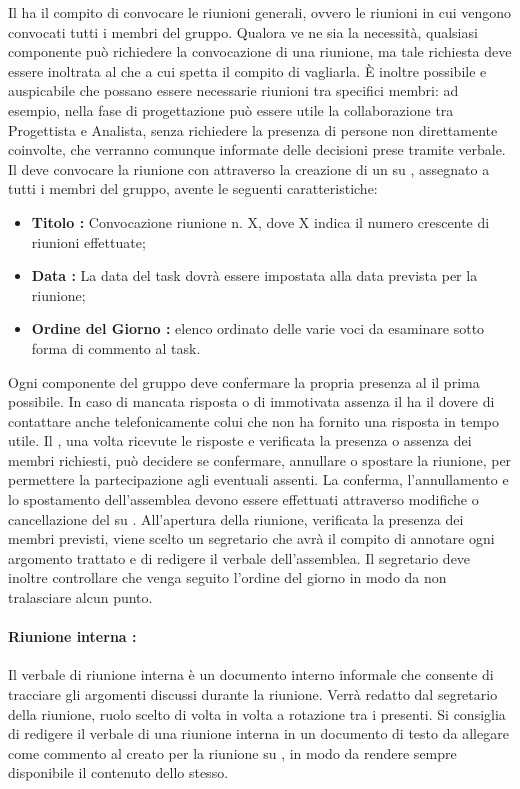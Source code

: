 \documentclass[12pt,a4paper]{article}
\begin{document}
Il \PM{} ha il compito di convocare le riunioni generali, ovvero le riunioni in cui vengono convocati tutti i membri del gruppo.
Qualora ve ne sia la necessità, qualsiasi componente può richiedere la convocazione di una riunione, ma tale richiesta deve essere inoltrata al \PM{} che a cui spetta il compito di vagliarla. È inoltre possibile e auspicabile che possano essere necessarie riunioni tra specifici membri: ad esempio, nella fase di progettazione può essere utile la collaborazione tra Progettista e Analista, senza richiedere la presenza di persone non direttamente coinvolte, che verranno comunque informate delle decisioni prese tramite verbale.
Il \PM{} deve convocare la riunione con attraverso la creazione di un \textit{} su \textit{}, assegnato a tutti i membri del gruppo, avente le seguenti caratteristiche:
\begin{itemize}
  \item \textbf{Titolo : } Convocazione riunione n. X, dove X indica il numero crescente di riunioni effettuate;
  \item \textbf{Data : } La data del task dovrà essere impostata alla data prevista per la riunione;
  \item \textbf{Ordine del Giorno : } elenco ordinato delle varie voci da esaminare sotto forma di commento al task.
\end{itemize}
Ogni componente del gruppo deve confermare la propria presenza al \PM{} il prima possibile. 
In caso di mancata risposta o di immotivata assenza il \PM{} ha il dovere di contattare anche telefonicamente colui che non ha fornito una risposta in tempo utile. Il \PM{}, una volta ricevute le risposte e verificata la presenza o assenza dei membri richiesti, può decidere se confermare, annullare o spostare la riunione, per permettere la partecipazione agli eventuali assenti. La conferma, l’annullamento e lo spostamento dell’assemblea devono essere effettuati attraverso modifiche o cancellazione del \textit{} su \textit{}.
All’apertura della riunione, verificata la presenza dei membri previsti, viene scelto un segretario che avrà il compito di annotare ogni argomento trattato e di redigere il verbale dell’assemblea.
Il segretario deve inoltre controllare che venga seguito l’ordine del giorno in modo da non tralasciare alcun punto.
\paragraph{Riunione interna :}
Il verbale di riunione interna è un documento interno informale che consente di tracciare gli argomenti discussi durante la riunione. Verrà redatto dal segretario della riunione, ruolo scelto di volta in volta a rotazione tra i presenti. Si consiglia di redigere il verbale di una riunione interna in un documento di testo da allegare come commento al \textit{} creato per la riunione su \textit{}, in modo da rendere sempre disponibile il contenuto dello stesso.
\end{document}
